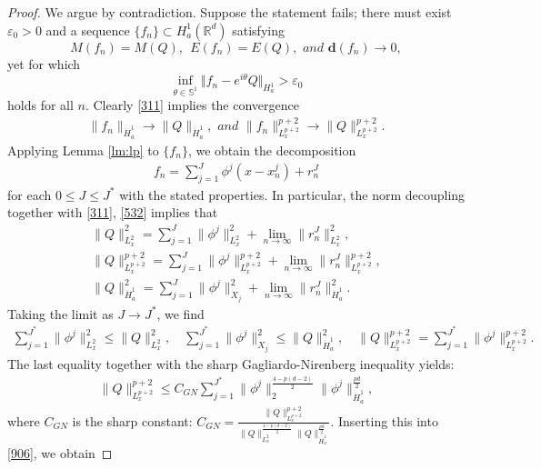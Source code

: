 \documentclass[12pt]{amsart}
\newcommand{\ha}{\dot H^1_a}
\begin{document}
\begin{proof}
We argue by contradiction. Suppose the statement fails; there must 
exist $\varepsilon _{0}>0$ and a sequence $\{f_{n}\}\subset H_{a}^{1}(%
\mathbb{R}^{d})$ satisfying 
\begin{equation}\label{311}
M(f_{n})=M(Q),\ \ E(f_{n})=E(Q),\textit{ and  }\mathbf{d}(f_{n})\rightarrow 0,
\end{equation}
yet for which
\begin{equation}\label{b531}
\inf_{\theta \in \mathbb{S}^{1}}\Vert f_n-e^{i\theta }Q\Vert
_{H_{a}^{1}}>\varepsilon _{0}
\end{equation}%
holds for all $n$. Clearly \eqref{311} implies the convergence 
\begin{align}\label{532}
\|f_n\|_{\ha}\to \|Q\|_{\ha}, \textit{ and } \|f_n\|_{L_x^{p+2}}^{p+2}\to \|Q\|_{L_x^{p+2}}^{p+2}. 
\end{align}
Applying Lemma \ref{lm:lp} to $\{f_n\}$, we obtain the decomposition 
\begin{align*}
f_n=\sum_{j=1}^J\phi^j(x-x_n^j)+r_n^J
\end{align*}
for each $0 \le J \le J^*$ with the stated properties. In particular, the norm decoupling together with \eqref{311}, \eqref{532} implies that 
\begin{gather*}
\|Q\|_{L_x^2}^2=\sum_{j=1}^J \|\phi^j\|_{L_x^2}^2+\lim_{n\to \infty}\|r_n^J\|_{L_x^2}^2, \\
\|Q\|_{L_x^{p+2}}^{p+2}=\sum_{j=1}^J\|\phi^j\|_{L_x^{p+2}}^{p+2}+\lim_{n\to \infty}\|r_n^J\|_{L_x^{p+2}}^{p+2},\\
\|Q\|_{\ha}^2=\sum_{j=1}^J\|\phi^j\|_{X_j}^2+\lim_{n\to \infty} \|r_n^J\|_{\ha}^2. 
\end{gather*}
Taking the limit as $J\to J^*$, we find  
\begin{align}\label{557}
\sum_{j=1}^{J^*} \|\phi^j\|_{L_x^2}^2\le \|Q\|_{L_x^2}^2, \quad \sum_{j=1}^{J^*}\|\phi^j\|_{X_j}^2\le \|Q\|_{\ha}^2, 
\quad \|Q\|_{L_x^{p+2}}^{p+2}=\sum_{j=1}^{J^*}\|\phi^j\|_{L_x^{p+2}}^{p+2}. 
\end{align}
The last equality together with the sharp Gagliardo-Nirenberg inequality yields:
\begin{align}\label{906}
\|Q\|_{L_x^{p+2}}^{p+2}\le C_{GN}\sum_{j=1}^{J^*}\|\phi^j\|_{2}^{\frac{4-p(d-2)}2}\|\phi^j\|_{\ha}^{\frac{pd}2},
\end{align}
where $C_{GN}$ is the sharp constant: $C_{GN}=\tfrac{\|Q\|_{L_x^{p+2}}^{p+2}}{\|Q\|_{L_x^2}^{\frac{4-p(d-2)}2}\|Q\|_{\ha}^{\frac{pd}2}}$. Inserting this into \eqref{906}, we obtain 

\end{proof}
\end{document}
